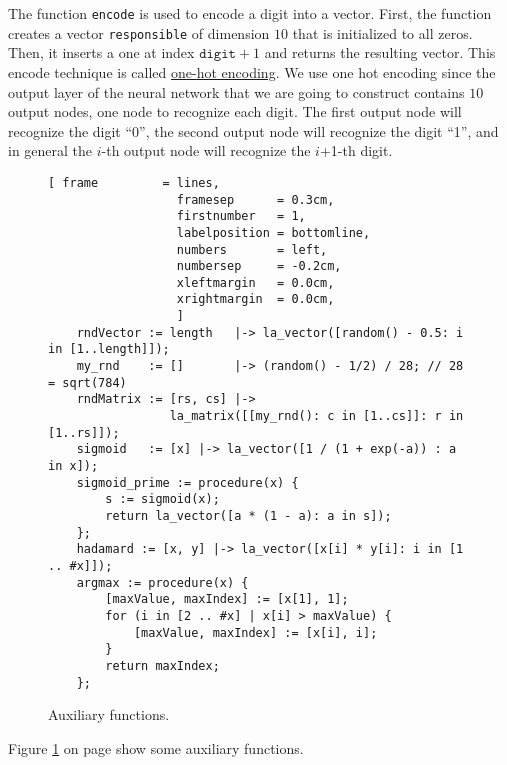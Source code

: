 The function \texttt{encode} is used to encode a digit into a vector.  First, the function creates a vector
\texttt{responsible} of dimension $10$ that is initialized to all zeros.  Then, it inserts a one at index
$\texttt{digit}+1$ and returns the resulting vector.  This encode technique is called
\href{https://en.wikipedia.org/wiki/One-hot}{one-hot encoding}.  We use one hot encoding since the output layer
of the neural network that we are going to construct contains $10$ output nodes, one node to recognize each
digit.  The first output node will recognize the digit ``0'', the second output node will recognize the digit
``1'', and in general the $i$-th output node will recognize the $i$+1-th digit.

\begin{figure}[!ht]
\centering
\begin{Verbatim}[ frame         = lines, 
                  framesep      = 0.3cm, 
                  firstnumber   = 1,
                  labelposition = bottomline,
                  numbers       = left,
                  numbersep     = -0.2cm,
                  xleftmargin   = 0.0cm,
                  xrightmargin  = 0.0cm,
                  ]
    rndVector := length   |-> la_vector([random() - 0.5: i in [1..length]]);
    my_rnd    := []       |-> (random() - 1/2) / 28; // 28 = sqrt(784)
    rndMatrix := [rs, cs] |->
                 la_matrix([[my_rnd(): c in [1..cs]]: r in [1..rs]]);
    sigmoid   := [x] |-> la_vector([1 / (1 + exp(-a)) : a in x]);
    sigmoid_prime := procedure(x) {
        s := sigmoid(x); 
        return la_vector([a * (1 - a): a in s]);
    };
    hadamard := [x, y] |-> la_vector([x[i] * y[i]: i in [1 .. #x]]);
    argmax := procedure(x) {
        [maxValue, maxIndex] := [x[1], 1];
        for (i in [2 .. #x] | x[i] > maxValue) {
            [maxValue, maxIndex] := [x[i], i];
        }
        return maxIndex;
    };
\end{Verbatim}
\vspace*{-0.3cm}
\caption{Auxiliary functions.}
\label{fig:nn.stlx:auxiliary}
\end{figure}
Figure \ref{fig:nn.stlx:auxiliary} on page \pageref{fig:nn.stlx:auxiliary} show some auxiliary functions.
